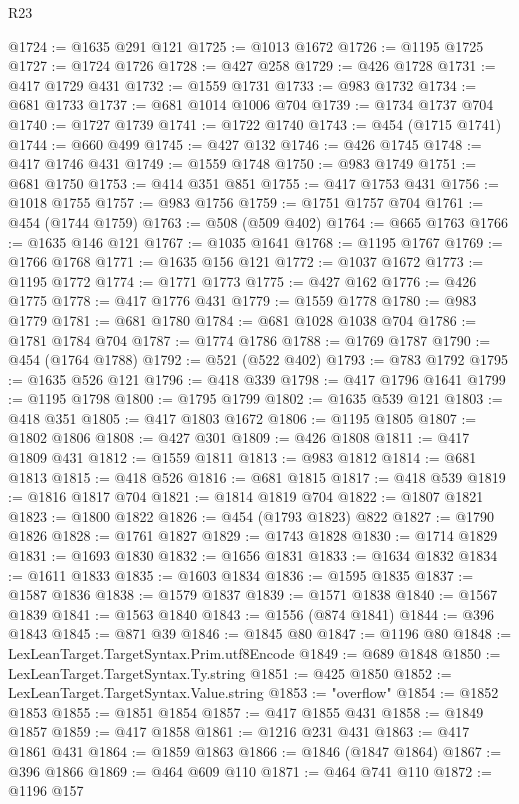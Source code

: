 \begin{lexlean}{R23}
\begin{coremodule}
@1724 := @1635 @291 @121
@1725 := @1013 @1672
@1726 := @1195 @1725
@1727 := @1724 @1726
@1728 := @427 @258
@1729 := @426 @1728
@1731 := @417 @1729 @431
@1732 := @1559 @1731
@1733 := @983 @1732
@1734 := @681 @1733
@1737 := @681 @1014 @1006 @704
@1739 := @1734 @1737 @704
@1740 := @1727 @1739
@1741 := @1722 @1740
@1743 := @454 (@1715 @1741)
@1744 := @660 @499
@1745 := @427 @132
@1746 := @426 @1745
@1748 := @417 @1746 @431
@1749 := @1559 @1748
@1750 := @983 @1749
@1751 := @681 @1750
@1753 := @414 @351 @851
@1755 := @417 @1753 @431
@1756 := @1018 @1755
@1757 := @983 @1756
@1759 := @1751 @1757 @704
@1761 := @454 (@1744 @1759)
@1763 := @508 (@509 @402)
@1764 := @665 @1763
@1766 := @1635 @146 @121
@1767 := @1035 @1641
@1768 := @1195 @1767
@1769 := @1766 @1768
@1771 := @1635 @156 @121
@1772 := @1037 @1672
@1773 := @1195 @1772
@1774 := @1771 @1773
@1775 := @427 @162
@1776 := @426 @1775
@1778 := @417 @1776 @431
@1779 := @1559 @1778
@1780 := @983 @1779
@1781 := @681 @1780
@1784 := @681 @1028 @1038 @704
@1786 := @1781 @1784 @704
@1787 := @1774 @1786
@1788 := @1769 @1787
@1790 := @454 (@1764 @1788)
@1792 := @521 (@522 @402)
@1793 := @783 @1792
@1795 := @1635 @526 @121
@1796 := @418 @339
@1798 := @417 @1796 @1641
@1799 := @1195 @1798
@1800 := @1795 @1799
@1802 := @1635 @539 @121
@1803 := @418 @351
@1805 := @417 @1803 @1672
@1806 := @1195 @1805
@1807 := @1802 @1806
@1808 := @427 @301
@1809 := @426 @1808
@1811 := @417 @1809 @431
@1812 := @1559 @1811
@1813 := @983 @1812
@1814 := @681 @1813
@1815 := @418 @526
@1816 := @681 @1815
@1817 := @418 @539
@1819 := @1816 @1817 @704
@1821 := @1814 @1819 @704
@1822 := @1807 @1821
@1823 := @1800 @1822
@1826 := @454 (@1793 @1823) @822
@1827 := @1790 @1826
@1828 := @1761 @1827
@1829 := @1743 @1828
@1830 := @1714 @1829
@1831 := @1693 @1830
@1832 := @1656 @1831
@1833 := @1634 @1832
@1834 := @1611 @1833
@1835 := @1603 @1834
@1836 := @1595 @1835
@1837 := @1587 @1836
@1838 := @1579 @1837
@1839 := @1571 @1838
@1840 := @1567 @1839
@1841 := @1563 @1840
@1843 := @1556 (@874 @1841)
@1844 := @396 @1843
@1845 := @871 @39
@1846 := @1845 @80
@1847 := @1196 @80
@1848 := LexLeanTarget.TargetSyntax.Prim.utf8Encode
@1849 := @689 @1848
@1850 := LexLeanTarget.TargetSyntax.Ty.string
@1851 := @425 @1850
@1852 := LexLeanTarget.TargetSyntax.Value.string
@1853 := "overflow"
@1854 := @1852 @1853
@1855 := @1851 @1854
@1857 := @417 @1855 @431
@1858 := @1849 @1857
@1859 := @417 @1858
@1861 := @1216 @231 @431
@1863 := @417 @1861 @431
@1864 := @1859 @1863
@1866 := @1846 (@1847 @1864)
@1867 := @396 @1866
@1869 := @464 @609 @110
@1871 := @464 @741 @110
@1872 := @1196 @157

\end{coremodule}
\end{lexlean}
